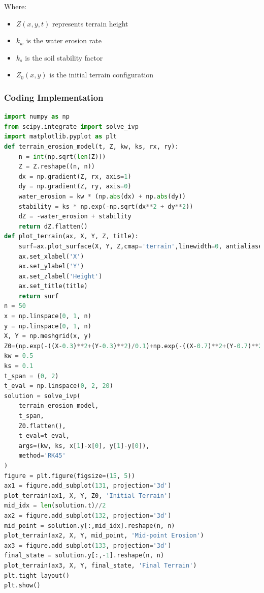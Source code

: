 \documentclass[12pt,a4paper]{article}
\begin{document}
Where:
\begin{itemize}
    \item $Z(x,y,t)$ represents terrain height
    \item $k_w$ is the water erosion rate
    \item $k_s$ is the soil stability factor
    \item $Z_0(x,y)$ is the initial terrain configuration
\end{itemize}
\newpage
\subsubsection{Coding Implementation}
\begin{lstlisting}[language=Python]
import numpy as np
from scipy.integrate import solve_ivp
import matplotlib.pyplot as plt
def terrain_erosion_model(t, Z, kw, ks, rx, ry):
    n = int(np.sqrt(len(Z)))
    Z = Z.reshape((n, n))
    dx = np.gradient(Z, rx, axis=1)
    dy = np.gradient(Z, ry, axis=0)
    water_erosion = kw * (np.abs(dx) + np.abs(dy))
    stability = ks * np.exp(-np.sqrt(dx**2 + dy**2))
    dZ = -water_erosion + stability
    return dZ.flatten()
def plot_terrain(ax, X, Y, Z, title):
    surf=ax.plot_surface(X, Y, Z,cmap='terrain',linewidth=0, antialiased=True)
    ax.set_xlabel('X')
    ax.set_ylabel('Y')
    ax.set_zlabel('Height')
    ax.set_title(title)
    return surf
n = 50
x = np.linspace(0, 1, n)
y = np.linspace(0, 1, n)
X, Y = np.meshgrid(x, y)
Z0=(np.exp(-((X-0.3)**2+(Y-0.3)**2)/0.1)+np.exp(-((X-0.7)**2+(Y-0.7)**2)/0.1))
kw = 0.5
ks = 0.1
t_span = (0, 2)
t_eval = np.linspace(0, 2, 20)
solution = solve_ivp(
    terrain_erosion_model, 
    t_span,
    Z0.flatten(),
    t_eval=t_eval,
    args=(kw, ks, x[1]-x[0], y[1]-y[0]),
    method='RK45'
)
figure = plt.figure(figsize=(15, 5))
ax1 = figure.add_subplot(131, projection='3d')
plot_terrain(ax1, X, Y, Z0, 'Initial Terrain')
mid_idx = len(solution.t)//2
ax2 = figure.add_subplot(132, projection='3d')
mid_point = solution.y[:,mid_idx].reshape(n, n)
plot_terrain(ax2, X, Y, mid_point, 'Mid-point Erosion')
ax3 = figure.add_subplot(133, projection='3d')
final_state = solution.y[:,-1].reshape(n, n)
plot_terrain(ax3, X, Y, final_state, 'Final Terrain')
plt.tight_layout()
plt.show()
\end{lstlisting}
\end{document}
